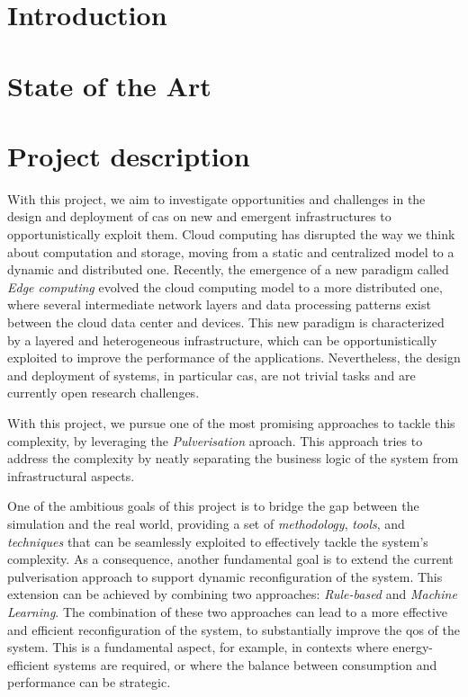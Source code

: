 \documentclass[12pt]{article}
\begin{document}
\section{Introduction}\label{sec:introduction}

\section{State of the Art}\label{sec:state-of-the-art}

\section{Project description}\label{sec:project-description}

With this project,
we aim to investigate opportunities and challenges in the design and deployment of
\ac{cas} on new and emergent infrastructures to opportunistically exploit them.
%
Cloud computing has disrupted the way we think about computation and storage,
moving from a static and centralized model to a dynamic and distributed one.
%
Recently,
the emergence of a new paradigm called \emph{Edge computing}
evolved the cloud computing model to a more distributed one,
where several intermediate network layers and data processing patterns exist between the cloud data center and devices.
%
This new paradigm is characterized by a layered and heterogeneous infrastructure,
which can be opportunistically exploited to improve the performance of the applications.
%
Nevertheless,
the design and deployment of systems, in particular \ac{cas},
are not trivial tasks and are currently open research challenges.

With this project,
we pursue one of the most promising approaches to tackle this complexity,
by leveraging the \emph{Pulverisation} aproach.
%
This approach tries to address the complexity by neatly separating the business logic of the system from infrastructural aspects.

One of the ambitious goals of this project is to bridge the gap between the simulation and the real world,
providing a set of \emph{methodology}, \emph{tools}, and \emph{techniques}
that can be seamlessly exploited to effectively tackle the system's complexity.
%
As a consequence,
another fundamental goal is to extend the current pulverisation approach to support dynamic reconfiguration of the system.
%
This extension can be achieved by combining two approaches: \emph{Rule-based} and \emph{Machine Learning}.
%
The combination of these two approaches can lead to a more effective and efficient reconfiguration of the system,
to substantially improve the \ac{qos} of the system.
%
This is a fundamental aspect,
for example,
in contexts where energy-efficient systems are required,
or where the balance between consumption and performance can be strategic.
\end{document}
